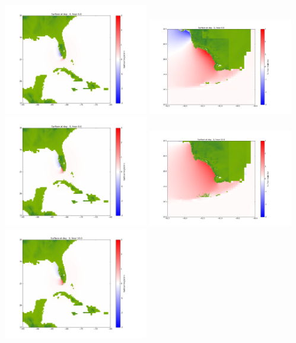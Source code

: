 \documentclass[11pt]{article}
\begin{document}
\includegraphics[width=0.475\textwidth]{frame0027fig1002.png}
\vskip 10pt 
\includegraphics[width=0.475\textwidth]{frame0028fig1001.png}
\includegraphics[width=0.475\textwidth]{frame0028fig1002.png}
\vskip 10pt 
\includegraphics[width=0.475\textwidth]{frame0029fig1001.png}
\includegraphics[width=0.475\textwidth]{frame0029fig1002.png}
\end{document}
